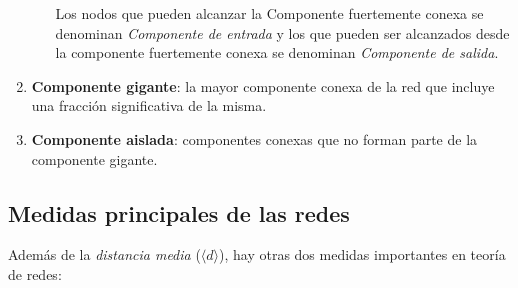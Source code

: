 \documentclass[10pt,spanish, landscape, twocolumn]{article}
\begin{document}
\begin{enumerate}[\color{temados}{$\spadesuit$}]
\begin{enumerate}[---]
        Los nodos que pueden alcanzar la Componente fuertemente conexa se denominan \textit{\textcolor{temados}{Componente de entrada}} y los que pueden ser alcanzados desde la componente fuertemente conexa se denominan \textit{\textcolor{temados}{Componente de salida}}.
    \end{enumerate}
    \item \textbf{\textcolor{temados}{Componente gigante}}: la mayor componente conexa de la red que incluye una fracción significativa de la misma.

    \item \textbf{\textcolor{temados}{Componente aislada}}: componentes conexas que no forman parte de la componente gigante.
\end{enumerate}

\subsection{\textcolor{temados}Medidas principales de las redes}
Además de la \textit{\textcolor{temados}{distancia media}} ($\langle d \rangle$), hay otras dos medidas importantes en teoría de redes:
\end{document}
